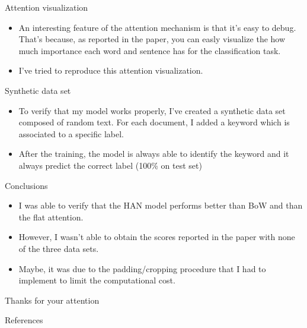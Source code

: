 \documentclass[10pt]{beamer}
\begin{document}
\begin{frame}[allowframebreaks]{Attention visualization}

\begin{itemize}
\item
An interesting feature of the attention mechanism is that it's easy to debug. That's because, as reported in the paper, you can easly visualize the how much importance each word and sentence has for the classification task.
\item
I've tried to reproduce this attention visualization.
\end{itemize}

\end{frame}

\begin{frame}{Synthetic data set}

\begin{itemize}
\item
To verify that my model works properly, I've created a synthetic data set composed of random text. For each document, I added a keyword which is associated to a specific label.
\item
After the training, the model is always able to identify the keyword and it always predict the correct label (100\% on test set)
\end{itemize}

\end{frame}


\begin{frame}{Conclusions}

\begin{itemize}
\item
I was able to verify that the HAN model performs better than BoW and than the flat attention.
\item
However, I wasn't able to obtain the scores reported in the paper with none of the three data sets.
\item
Maybe, it was due to the padding/cropping procedure that I had to implement to limit the computational cost.
\end{itemize}

\end{frame}



\begin{frame}

\begin{center}
\LARGE
Thanks for your attention
\end{center}

\end{frame}


\begin{frame}[allowframebreaks]{References}




\end{frame}
\end{document}
